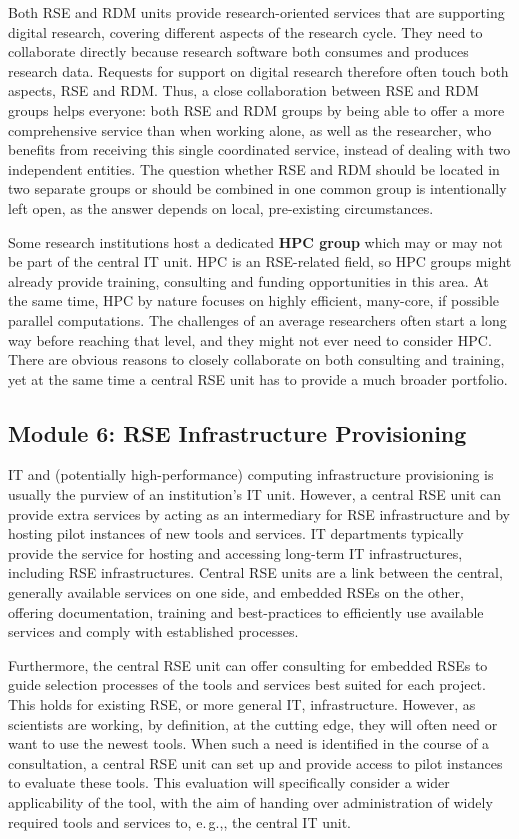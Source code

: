 \documentclass[10pt,letterpaper]{article}
\newcommand*{\eg}{e.\,g.,\xspace}
\begin{document}
Both RSE and RDM units provide research-oriented services that are supporting digital research, covering different aspects of the research cycle.
They need to collaborate directly because research software both consumes and produces research data.
Requests for support on digital research therefore often touch both aspects, RSE and RDM\@.
Thus, a close collaboration between RSE and RDM groups helps everyone: both RSE and RDM groups by being able to offer a more comprehensive service than when working alone, as well as the researcher, who benefits from receiving this single coordinated service, instead of dealing with two independent entities.
The question whether RSE and RDM should be located in two separate groups or should be combined in one common group is intentionally left open, as the answer depends on local, pre-existing circumstances.

Some research institutions host a dedicated \textbf{HPC group} which may or may not be part of the central IT unit.
HPC is an RSE-related field, so HPC groups might already provide training, consulting and funding opportunities in this area.
At the same time, HPC by nature focuses on highly efficient, many-core, if possible parallel computations.
The challenges of an average researchers often start a long way before reaching that level, and they might not ever need to consider HPC\@.
There are obvious reasons to closely collaborate on both consulting and training, yet at the same time a central RSE unit has to provide a much broader portfolio.

\subsection*{Module 6: RSE Infrastructure Provisioning}%
\label{sec:infrastructure}

IT and (potentially high-performance) computing infrastructure provisioning is usually the purview of an institution's IT unit.
However, a central RSE unit can provide extra services by acting as an intermediary for RSE infrastructure and by hosting pilot instances of new tools and services.
IT departments typically provide the service for hosting and accessing long-term IT infrastructures, including RSE infrastructures.
Central RSE units are a link between the central, generally available services on one side,
  and embedded RSEs on the other, offering documentation, training and best-practices to efficiently use available services and comply with established processes.

Furthermore, the central RSE unit can offer consulting for embedded RSEs to guide selection processes of the tools and services best suited for each project.
This holds for existing RSE, or more general IT, infrastructure.
However, as scientists are working, by definition, at the cutting edge, they will often need or want to use the newest tools.
When such a need is identified in the course of a consultation, a central RSE unit can set up and provide access to pilot instances to evaluate these tools.
This evaluation will specifically consider a wider applicability of the tool, with the aim of handing over administration of widely required tools and services to, \eg{}, the central IT unit.
\end{document}
